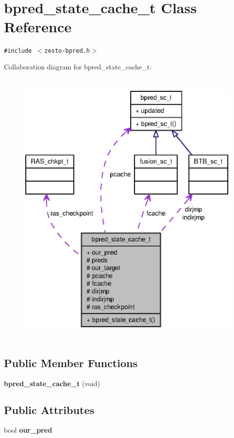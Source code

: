 \section{bpred\_\-state\_\-cache\_\-t Class Reference}
\label{classbpred__state__cache__t}
{\tt \#include $<$zesto-bpred.h$>$}

Collaboration diagram for bpred\_\-state\_\-cache\_\-t:\nopagebreak
\begin{figure}[H]
\begin{center}
\leavevmode
\includegraphics[height=400pt]{classbpred__state__cache__t__coll__graph}
\end{center}
\end{figure}
\subsection*{Public Member Functions}
\begin{CompactItemize}
\item 
{\bf bpred\_\-state\_\-cache\_\-t} (void)
\end{CompactItemize}
\subsection*{Public Attributes}
\begin{CompactItemize}
\item 
bool {\bf our\_\-pred}
\end{CompactItemize}
